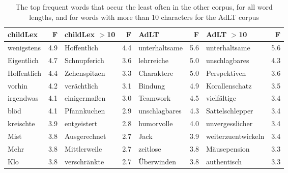 \documentclass[manuscript]{stjour}
\begin{document}
\begin{table}[!htbp]
\caption{The top frequent words that occur the least often in the other corpus, for all word lengths, and for words with more than 10 characters for the AdLT corpus}
\centering
\begin{tabular}{lrlrlrlr}
  \hline
childLex & F & childLex $>$10 & F & AdLT & F & AdLT $>$10 & F \\ 
  \hline
wenigstens & 4.9 & Hoffentlich & 4.4 & unterhaltsame & 5.6 & unterhaltsame & 5.6 \\ 
  Eigentlich & 4.7 & Schnupferich & 3.6 & lehrreiche & 5.0 & unschlagbares & 4.3 \\ 
  Hoffentlich & 4.4 & Zehenspitzen & 3.3 & Charaktere & 5.0 & Perspektiven & 3.6 \\ 
  vorhin & 4.2 & verächtlich & 3.1 & Bindung & 4.9 & Korallenschatz & 3.5 \\ 
  irgendwas & 4.1 & einigermaßen & 3.0 & Teamwork & 4.5 & vielfältige & 3.4 \\ 
  blöd & 4.1 & Pfannkuchen & 2.9 & unschlagbares & 4.3 & Sattelschlepper & 3.4 \\ 
  kreischte & 3.9 & entgeistert & 2.8 & humorvolle & 4.0 & unvergesslicher & 3.4 \\ 
  Mist & 3.8 & Ausgerechnet & 2.7 & Jack & 3.9 & weiterzuentwickeln & 3.4 \\ 
  Mehr & 3.8 & Mittlerweile & 2.7 & zeitlose & 3.8 & Mäusepension & 3.3 \\ 
  Klo & 3.8 & verschränkte & 2.7 & Überwinden & 3.8 & authentisch & 3.3 \\ 
   \hline
\end{tabular}
\label{words-adlt-low}
\end{table}
\end{document}
